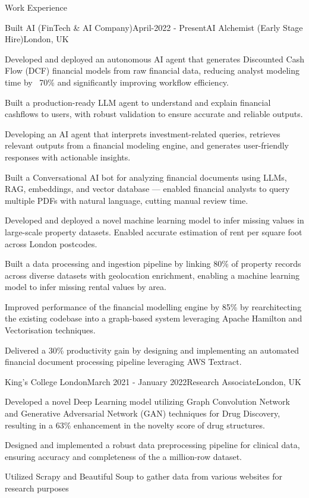 \documentclass{resume} %
\begin{document}
\begin{rSection}{Work Experience}
\begin{rSubsection}{Built AI (FinTech \& AI Company)}{April-2022 - Present}{AI Alchemist (Early Stage Hire)}{London, UK}
\item Developed and deployed an autonomous AI agent that generates Discounted Cash Flow (DCF) financial models from raw financial data, reducing analyst modeling time by ~70\% and significantly improving workflow efficiency.
\item Built a production-ready LLM agent to understand and explain financial cashflows to users, with robust validation to ensure accurate and reliable outputs.
\item Developing an AI agent that interprets investment-related queries, retrieves relevant outputs from a financial modeling engine, and generates user-friendly responses with actionable insights.
\item Built a Conversational AI bot for analyzing financial documents using LLMs, RAG, embeddings, and vector database — enabled financial analysts to query multiple PDFs with natural language, cutting manual review time.
\item Developed and deployed a novel machine learning model to infer missing values in large-scale property datasets. Enabled accurate estimation of rent per square foot across London postcodes.
\item Built a data processing and ingestion pipeline by linking 80\% of property records across diverse datasets with geolocation enrichment, enabling a machine learning model to infer missing rental values by area.
\item Improved performance of the financial modelling engine by 85\% by rearchitecting the existing codebase into a graph-based system leveraging Apache Hamilton and Vectorisation techniques.
\item Delivered a 30\% productivity gain by designing and implementing an automated financial document processing pipeline leveraging AWS Textract.
\end{rSubsection}


\begin{rSubsection}{King's College London}{March 2021 - January 2022}{Research Associate}{London, UK}
\item Developed a novel Deep Learning model utilizing Graph Convolution Network and Generative Adversarial Network (GAN) techniques for Drug Discovery, resulting in a 63\% enhancement in the novelty score of
drug structures.
\item Designed and implemented a robust data preprocessing pipeline for clinical data, ensuring accuracy and completeness of the a million-row dataset.
\item Utilized Scrapy and Beautiful Soup to gather data from various websites for research purposes

\end{rSubsection}

\end{rSection}
\end{document}
